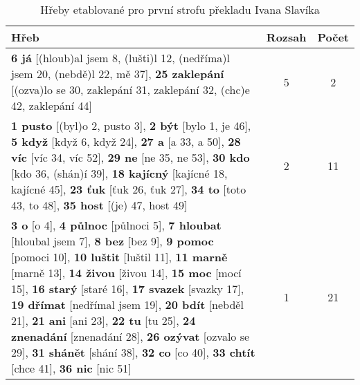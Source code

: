 \documentclass[dp.tex]{subfiles}
\begin{document}
\begin {table}[H]
	\caption {Hřeby etablované pro první strofu překladu Ivana Slavíka} 
	\label{tab:hreby-1-strofa-slavik} 

	\begin{center}
		\begin{tabular}{|p{10cm}|c|c|}
		\hline 
		\bfseries Hřeb & \bfseries Rozsah & \bfseries Počet \\ \hline
		\textbf{6 já} [(hloub)al jsem 8, (lušti)l 12, (nedříma)l jsem 20, (nebdě)l 22, mě 37], \textbf{25 zaklepání} [(ozva)lo se 30, zaklepání 31, zaklepání 32, (chc)e 42, zaklepání 44] 
		& 5 & 2 \\ \hline
		
		\textbf{1 pusto} [(byl)o 2, pusto 3], \textbf{2 být} [bylo 1, je 46], \textbf{5 když} [když 6, když 24], \textbf{27 a} [a 33, a 50], \textbf{28 víc} [víc 34, víc 52], \textbf{29 ne} [ne 35, ne 53], \textbf{30 kdo} [kdo 36, (shán)í 39], \textbf{18 kajícný} [kajícné 18, kajícné 45], \textbf{23 ťuk} [ťuk 26, ťuk 27], \textbf{34 to} [toto 43, to 48], \textbf{35 host} [(je) 47, host 49] 
		& 2 & 11\\ \hline
		
		\textbf{3 o} [o 4], \textbf{4 půlnoc} [půlnoci 5], \textbf{7 hloubat} [hloubal jsem 7], \textbf{8 bez} [bez 9], \textbf{9 pomoc} [pomoci 10], \textbf{10 luštit} [luštil 11], \textbf{11 marně} [marně 13], \textbf{14 živou} [živou 14], \textbf{15 moc} [mocí 15], \textbf{16 starý} [staré 16], \textbf{17 svazek} [svazky 17], \textbf{19 dřímat} [nedřímal jsem 19], \textbf{20 bdít} [nebděl 21], \textbf{21 ani} [ani 23], \textbf{22 tu} [tu 25], \textbf{24 znenadání} [znenadání 28], \textbf{26 ozývat} [ozvalo se 29], \textbf{31 shánět} [shání 38], \textbf{32 co} [co 40], \textbf{33 chtít} [chce 41], \textbf{36 nic} [nic 51]
		& 1 & 21 \\ \hline

		\end{tabular} 
	\end{center}
\end{table}
\end{document}
